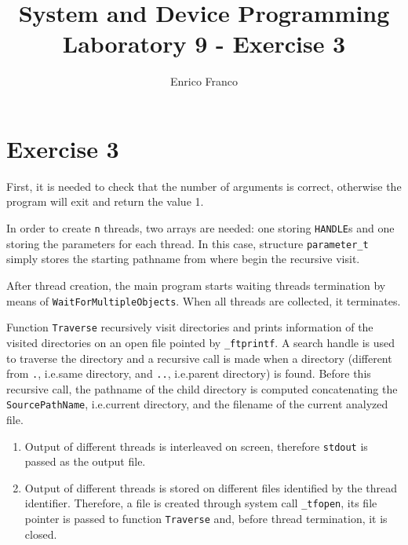 \documentclass{report}
\author{Enrico Franco}
\title{System and Device Programming \\
	Laboratory 9 - Exercise 3}
\begin{document}
\section*{Exercise 3}

First, it is needed to check that the number of arguments is correct, otherwise
the program will exit and return the value 1.

In order to create \texttt{n} threads, two arrays are needed: one storing \texttt{HANDLE}s and one storing the parameters for each thread. In this case, structure \texttt{parameter\_t} simply stores the starting pathname from where begin the recursive visit.

After thread creation, the main program starts waiting threads termination by means of \texttt{WaitForMultipleObjects}. When all threads are collected, it terminates.

Function \texttt{Traverse} recursively visit directories and prints information of the visited directories on an open file pointed by \texttt{\_ftprintf}. A search handle is used to traverse the directory and a recursive call is made when a directory (different from \texttt{.}, i.e.\@ same directory, and \texttt{..}, i.e.\@ parent directory) is found. Before this recursive call, the pathname of the child directory is computed concatenating the \texttt{SourcePathName}, i.e.\@ current directory, and the filename of the current analyzed file.

\begin{enumerate}[label=Version \Alph*]
\item Output of different threads is interleaved on screen, therefore \texttt{stdout} is passed as the output file.
\item Output of different threads is stored on different files identified by the thread identifier. Therefore, a file is created through system call \texttt{\_tfopen}, its file pointer is passed to function \texttt{Traverse} and, before thread termination, it is closed.
\end{enumerate}
\end{document}
